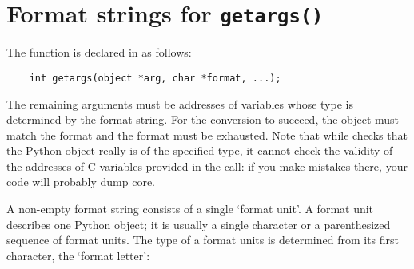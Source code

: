 \section{Format strings for {\tt getargs()}}

The  function is declared in  as
follows:

\begin{verbatim}
    int getargs(object *arg, char *format, ...);
\end{verbatim}

The remaining arguments must be addresses of variables whose type is
determined by the format string.  For the conversion to succeed, the
 object must match the format and the format must be exhausted.
Note that while  checks that the Python object really
is of the specified type, it cannot check the validity of the
addresses of C variables provided in the call: if you make mistakes
there, your code will probably dump core.

A non-empty format string consists of a single `format unit'.  A
format unit describes one Python object; it is usually a single
character or a parenthesized sequence of format units.  The type of a
format units is determined from its first character, the `format
letter':

